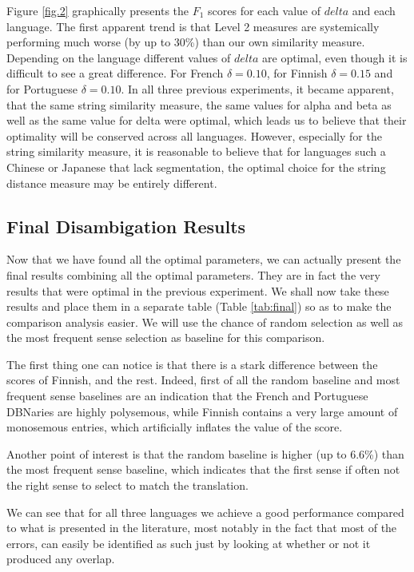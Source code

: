 \documentclass[10pt, a4paper]{article}
\begin{document}
Figure \ref{fig.2} graphically presents the \(F_1\) scores for each value of \(delta\) and each language. The first apparent trend is that Level 2 measures are systemically performing much worse (by up to 30\%) than our own similarity measure. Depending on the language different values of \(delta\) are optimal, even though it is difficult to see a great difference. For French \(\delta=0.10\), for Finnish \(\delta=0.15\)
 and for Portuguese \(\delta=0.10\). 
In all three previous experiments, it became apparent, that the same string similarity measure, the same values for alpha and beta as well as the same value for delta were optimal, which leads us to believe that their optimality will be conserved across all languages. However, especially for the string similarity measure, it is reasonable to believe that for languages such a Chinese or Japanese that lack segmentation, the optimal choice for the string distance measure may be entirely different.
\subsection{Final Disambigation Results}

Now that we have found all the optimal parameters, we can actually present the final results combining all the optimal parameters. They are in fact the very results that were optimal in the previous experiment. We shall now take these results and place them in a separate table (Table \ref{tab:final}) so as to make the comparison analysis easier. We will use the chance of random selection as well as the most frequent sense selection as baseline for this comparison.

The first thing one can notice is that there is a stark difference between the scores of Finnish, and the rest. Indeed, first of all the random baseline and most frequent sense baselines are an indication that the French and Portuguese DBNaries are highly polysemous, while Finnish contains a very large amount of monosemous entries, which artificially inflates the value of the score. 

Another point of interest is that the random baseline is higher (up to 6.6\%) than the most frequent sense baseline, which indicates that the first sense if often not the right sense to select to match the translation. 

We can see that for all three languages we achieve a good performance compared to what is presented in the literature, most notably in the fact that most of the errors, can easily be identified as such just by looking at whether or not it produced any overlap.
\end{document}
